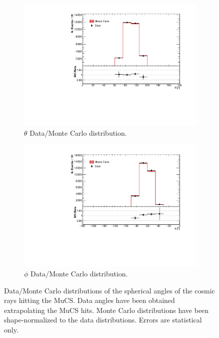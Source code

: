 \documentclass[a4paper]{scrartcl}
\begin{document}
\begin{figure}[htbp]
  \begin{subfigure}{0.52\textwidth}
    \includegraphics[width=\linewidth]{figures/theta_mucs.pdf}
    \caption{$\theta$ Data/Monte Carlo distribution.} \label{fig:theta_mucs}
  \end{subfigure}
  \begin{subfigure}{0.52\textwidth}
    \includegraphics[width=\linewidth]{figures/phi_mucs.pdf}
    \caption{$\phi$ Data/Monte Carlo distribution.} \label{fig:phi_mucs}
  \end{subfigure}
  \caption{Data/Monte Carlo distributions of the spherical angles of the cosmic rays hitting the MuCS. Data angles have been obtained extrapolating the MuCS hits. Monte Carlo distributions have been shape-normalized to the data distributions. Errors are statistical only.} \label{fig:mucs_angles}


\end{figure}
\end{document}
